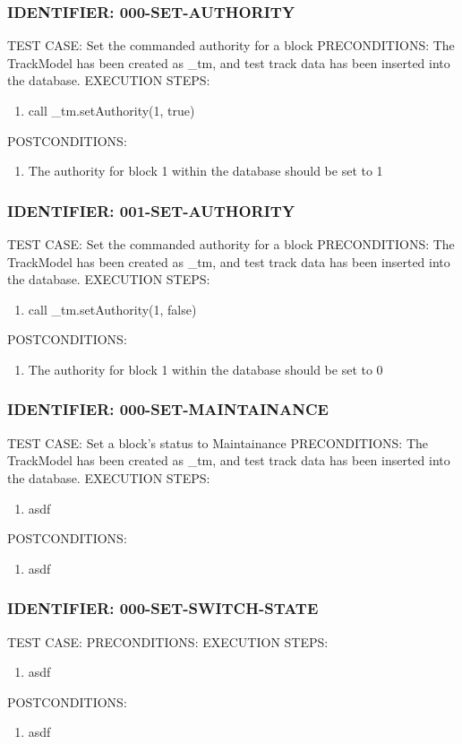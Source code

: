 \documentclass{scrreprt}
\begin{document}
\subsubsection{IDENTIFIER: 000-SET-AUTHORITY}
TEST CASE: Set the commanded authority for a block
PRECONDITIONS: The TrackModel has been created as _tm, and test track data has been inserted into the database.
EXECUTION STEPS:
\begin{enumerate}
	\item call _tm.setAuthority(1, true)
\end{enumerate}
POSTCONDITIONS:
\begin{enumerate}
	\item The authority for block 1 within the database should be set to 1
\end{enumerate}

\subsubsection{IDENTIFIER: 001-SET-AUTHORITY}
TEST CASE: Set the commanded authority for a block
PRECONDITIONS: The TrackModel has been created as _tm, and test track data has been inserted into the database.
EXECUTION STEPS:
\begin{enumerate}
	\item call _tm.setAuthority(1, false)
\end{enumerate}
POSTCONDITIONS:
\begin{enumerate}
	\item The authority for block 1 within the database should be set to 0
\end{enumerate}

\subsubsection{IDENTIFIER: 000-SET-MAINTAINANCE}
TEST CASE: Set a block's status to Maintainance
PRECONDITIONS: The TrackModel has been created as _tm, and test track data has been inserted into the database.
EXECUTION STEPS:
\begin{enumerate}
	\item asdf
\end{enumerate}
POSTCONDITIONS:
\begin{enumerate}
	\item asdf
\end{enumerate}

\subsubsection{IDENTIFIER: 000-SET-SWITCH-STATE}
TEST CASE:
PRECONDITIONS:
EXECUTION STEPS:
\begin{enumerate}
	\item asdf
\end{enumerate}
POSTCONDITIONS:
\begin{enumerate}
	\item asdf
\end{enumerate}
\end{document}
